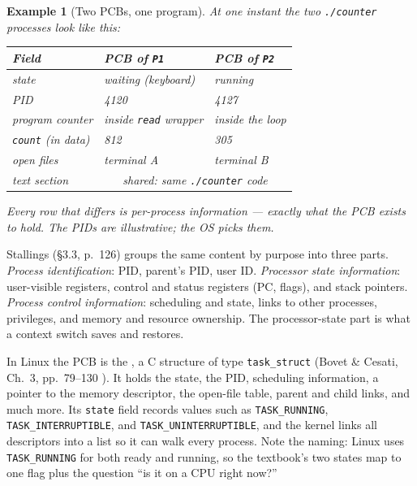 \documentclass[11pt]{article}
\newtheorem{example}{Example}
\begin{document}
\begin{example}[Two PCBs, one program]
At one instant the two \texttt{./counter} processes look like this:

\begin{center}\small
\renewcommand{\arraystretch}{1.2}
\begin{tabular}{@{}lll@{}}
\toprule
\textbf{Field} & \textbf{PCB of \texttt{P1}} & \textbf{PCB of \texttt{P2}} \\
\midrule
state & waiting (keyboard) & running \\
PID & 4120 & 4127 \\
program counter & inside \texttt{read} wrapper & inside the loop \\
\texttt{count} (in data) & 812 & 305 \\
open files & terminal A & terminal B \\
text section & \multicolumn{2}{c}{shared: same \texttt{./counter} code} \\
\bottomrule
\end{tabular}
\end{center}
Every row that differs is per-process information --- exactly what the PCB
exists to hold. The PIDs are illustrative; the OS picks them.
\end{example}

Stallings (\S3.3, p.~126) groups the same content by purpose into three parts.
\emph{Process identification}: PID, parent's PID, user ID. \emph{Processor state
information}: user-visible registers, control and status registers (PC, flags),
and stack pointers. \emph{Process control information}: scheduling and state,
links to other processes, privileges, and memory and resource ownership. The
processor-state part is what a context switch saves and restores.

In Linux the PCB is the , a C structure of type
\texttt{task\_struct} (Bovet \& Cesati, Ch.~3, pp.~79--130
\cite{BovetCesati_understanding_linux_kernel}). It holds the state, the PID,
scheduling information, a pointer to the memory descriptor, the open-file table,
parent and child links, and much more. Its \texttt{state} field records values
such as \texttt{TASK\_RUNNING}, \texttt{TASK\_INTERRUPTIBLE}, and
\texttt{TASK\_UNINTERRUPTIBLE}, and the kernel links all descriptors into a list
so it can walk every process. Note the naming: Linux uses
\texttt{TASK\_RUNNING} for both ready and running, so the textbook's two states
map to one flag plus the question ``is it on a CPU right now?''
\end{document}
